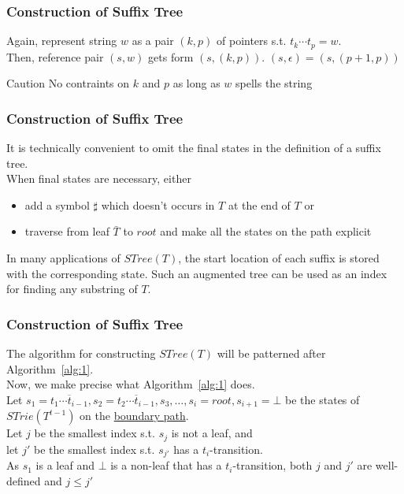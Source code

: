 \documentclass[compress,usenames,dvipsnames]{beamer}
\begin{document}
    \begin{frame}\frametitle{Construction of Suffix Tree}
        Again, represent string $w$ as a pair $(k, p)$ of pointers s.t. $t_k \cdots t_p = w$. \\
        Then, reference pair $(s, w)$ gets form $(s, (k, p))$. $(s, \epsilon) = (s, (p + 1, p))$ \\
        \begin{alertblock}{Caution}
            No contraints on $k$ and $p$ as long as $w$ spells the string
        \end{alertblock}
    \end{frame}

    \begin{frame}\frametitle{Construction of Suffix Tree}
        It is technically convenient to omit the final states in the definition of a suffix tree. \\
        When final states are necessary, either \\
        \begin{itemize}
            \item add a symbol $\sharp$ which doesn't occurs in $T$ at the end of $T$ or 
            \item traverse from leaf $\bar{T}$ to $root$ and make all the states on the path explicit
        \end{itemize}
        In many applications of $STree(T)$, the start location of each suffix is stored with the corresponding state. Such an augmented tree can be used as an index for finding any substring of $T$.
    \end{frame}

    \begin{frame}\frametitle{Construction of Suffix Tree}
        The algorithm for constructing $STree(T)$ will be patterned after Algorithm~\ref{alg:1}. \\
        Now, we make precise what Algorithm~\ref{alg:1} does. \\
        \hfill \break
        Let $s_1 = \overline{t_1\cdots t_{i-1}},s_2=\overline{t_2\cdots t_{i-1}},s_3,\ldots,s_i=root,s_{i+1}=\bot$ be the states of $STrie(T^{t-1})$ on the \underline{boundary path}. \\
        \hfill \break
        Let $j$ be the smallest index s.t. $s_j$ is not a leaf, and \\
        let $j'$ be the smallest index s.t. $s_{j'}$ has a $t_i$-transition. \\
        \hfill \break
        As $s_1$ is a leaf and $\bot$ is a non-leaf that has a $t_i$-transition, both $j$ and $j'$ are well-defined and $j \leq j'$
    \end{frame}
\end{document}
